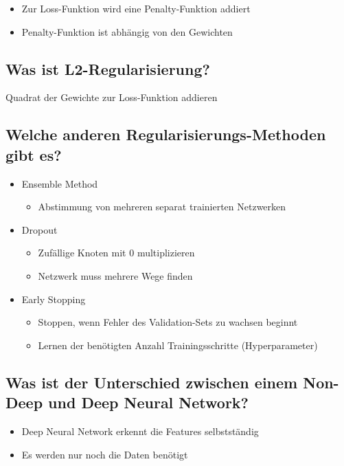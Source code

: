 \documentclass[a4paper]{article}
\begin{document}
		\begin{itemize}
			\item Zur Loss-Funktion wird eine Penalty-Funktion addiert
			\item Penalty-Funktion ist abhängig von den Gewichten
		\end{itemize}
	
		\subsection{Was ist L2-Regularisierung?}
		
		Quadrat der Gewichte zur Loss-Funktion addieren
		
		\subsection{Welche anderen Regularisierungs-Methoden gibt es?}
		
		\begin{itemize}
			\item Ensemble Method
				\begin{itemize}
					\item Abstimmung von mehreren separat trainierten Netzwerken
				\end{itemize}
			\item Dropout
				\begin{itemize}
					\item Zufällige Knoten mit 0 multiplizieren
					\item Netzwerk muss mehrere Wege finden
				\end{itemize}
			\item Early Stopping
				\begin{itemize}
					\item Stoppen, wenn Fehler des Validation-Sets zu wachsen beginnt
					\item Lernen der benötigten Anzahl Trainingsschritte (Hyperparameter)
				\end{itemize}
		\end{itemize}
	
		\subsection{Was ist der Unterschied zwischen einem Non-Deep und Deep Neural Network?}
		
		\begin{itemize}
			\item Deep Neural Network erkennt die Features selbstständig
			\item Es werden nur noch die Daten benötigt
		\end{itemize}
	
\end{document}
